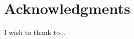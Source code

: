 
\begingroup
\let\clearpage\relax
\let\cleardoublepage\relax
\let\cleardoublepage\relax
\chapter*{Acknowledgments}
I wish to thank to...



\endgroup



